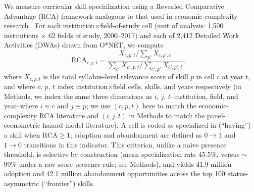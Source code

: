 \documentclass[11pt, letterpaper]{article}
\newcommand{\parencite}[1]{\cite{#1}}
\begin{document}
We measure curricular skill specialization using a Revealed Comparative Advantage (RCA) framework analogous to that used in economic-complexity research \parencite{balassa1965, hidalgohausmann2009}. For each institution$\times$field-of-study cell (unit of analysis: 1,500 institutions $\times$ 62 fields of study, 2000--2017) and each of 2,412 Detailed Work Activities (DWAs) drawn from O*NET, we compute
$$
\mathrm{RCA}_{c,p,t} = \frac{X_{c,p,t}/\sum_{p'} X_{c,p',t}}{\sum_{c'} X_{c',p,t}/\sum_{c',p'} X_{c',p',t}},
$$
where $X_{c,p,t}$ is the total syllabus-level relevance score of skill $p$ in cell $c$ at year $t$, and where $c$, $p$, $t$ index institution$\times$field cells, skills, and years respectively (in Methods, we index the same three dimensions as $i$, $j$, $t$--institution, field, and year--where $i\equiv c$ and $j\equiv p$; we use $(c,p,t)$ here to match the economic-complexity RCA literature and $(i,j,t)$ in Methods to match the panel-econometric hazard-model literature). A cell is coded as specialized in (``having'') a skill when $\mathrm{RCA} \geq 1$; adoption and abandonment are defined as $0\rightarrow1$ and $1\rightarrow0$ transitions in this indicator. This criterion, unlike a naive presence threshold, is selective by construction (mean specialization rate 45.5\%, versus $\sim$99\% under a raw score-presence rule; see Methods), and yields 41.9 million adoption and 42.1 million abandonment opportunities across the top 100 status-asymmetric (``frontier'') skills.

\begin{table}[H]
\centering
\caption{Associational baseline: discrete-time hazard model of frontier-skill adoption and abandonment as a function of exposure and institutional prestige (binary R1 status, Model~1--2; ordinal prestige tier and discipline-level prestige concentration, in the source code's ``gradient'' specification). Model includes year and field-of-study fixed effects only (no institution fixed effect); standard errors are IID (not clustered), as reported in the table footnote.}
\label{tab:main1}

\end{table}
\end{document}
